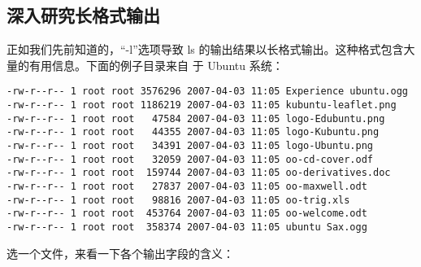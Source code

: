 \subsection{深入研究长格式输出}
正如我们先前知道的，“-l”选项导致 ls 的输出结果以长格式输出。这种格式包含大量的有用信息。下面的例子目录来自 于 Ubuntu 系统：

\begin{lstlisting}
-rw-r--r-- 1 root root 3576296 2007-04-03 11:05 Experience ubuntu.ogg
-rw-r--r-- 1 root root 1186219 2007-04-03 11:05 kubuntu-leaflet.png 
-rw-r--r-- 1 root root   47584 2007-04-03 11:05 logo-Edubuntu.png 
-rw-r--r-- 1 root root   44355 2007-04-03 11:05 logo-Kubuntu.png
-rw-r--r-- 1 root root   34391 2007-04-03 11:05 logo-Ubuntu.png
-rw-r--r-- 1 root root   32059 2007-04-03 11:05 oo-cd-cover.odf
-rw-r--r-- 1 root root  159744 2007-04-03 11:05 oo-derivatives.doc
-rw-r--r-- 1 root root   27837 2007-04-03 11:05 oo-maxwell.odt
-rw-r--r-- 1 root root   98816 2007-04-03 11:05 oo-trig.xls
-rw-r--r-- 1 root root  453764 2007-04-03 11:05 oo-welcome.odt
-rw-r--r-- 1 root root  358374 2007-04-03 11:05 ubuntu Sax.ogg 
\end{lstlisting}

\par 选一个文件，来看一下各个输出字段的含义：


